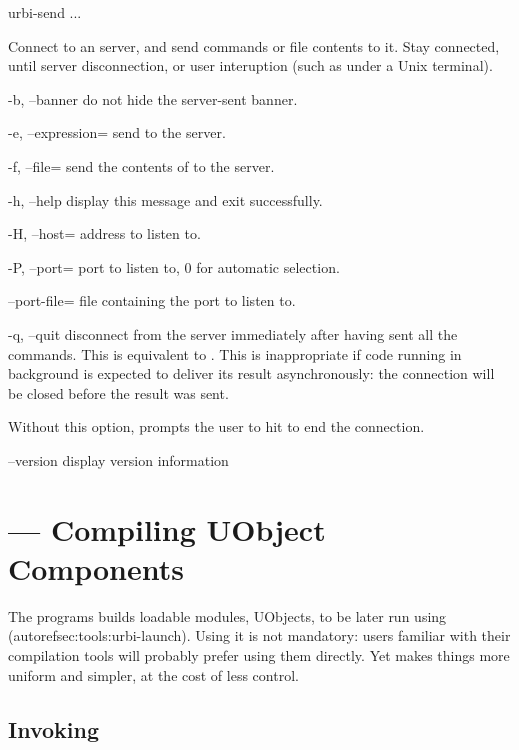 \begin{shell}
urbi-send ...
\end{shell}

Connect to an \urbi server, and send commands or file contents to it.
Stay connected, until server disconnection, or user interuption (such
as  under a Unix terminal).

\begin{options}
\item[-b, --banner] do not hide the server-sent banner.
\item[-e, --expression=\var{script}] send  to the server.
\item[-f, --file=\var{file}] send the contents of  to the
  server.
\item[-h, --help] display this message and exit successfully.
\item[-H, --host=\var{host}] address to listen to.
\item[-P, --port=\var{port}] port to listen to, 0 for automatic
  selection.
\item[--port-file=\var{file}] file containing the port to listen to.
\item[-q, --quit] disconnect from the server immediately after having
  sent all the commands.  This is equivalent to .
  This is inappropriate if code running in background is expected to
  deliver its result asynchronously: the connection will be closed
  before the result was sent.

  Without this option,  prompts the user to hit
   to end the connection.
\item[--version] display version information
\end{options}


\section{ --- Compiling UObject Components}
\label{sec:tools:umake}

The  programs builds loadable modules, UObjects, to be
later run using 
(autoref{sec:tools:urbi-launch}).  Using it is not mandatory: users
familiar with their compilation tools will probably prefer using them
directly.  Yet  makes things more uniform and simpler,
at the cost of less control.

\subsection{Invoking }
\label{sec:tools:umake:invoke}

